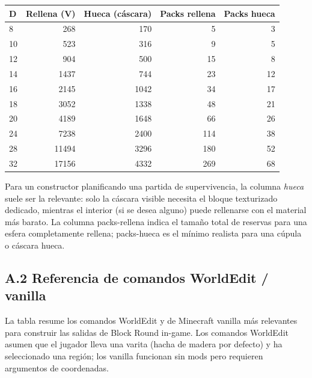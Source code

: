 \documentclass[12pt,a4paper]{scrartcl}
\begin{document}
\vspace{0.4em}
\begin{center}
\begin{tabular}{@{}lrrrr@{}}
\toprule
\textbf{D} & \textbf{Rellena (V)} & \textbf{Hueca (cáscara)} & \textbf{Packs rellena} & \textbf{Packs hueca} \\
\midrule
8   &   268 &   170 &  5  &  3  \\
10  &   523 &   316 &  9  &  5  \\
12  &   904 &   500 & 15  &  8  \\
14  &  1437 &   744 & 23  & 12  \\
16  &  2145 &  1042 & 34  & 17  \\
18  &  3052 &  1338 & 48  & 21  \\
20  &  4189 &  1648 & 66  & 26  \\
24  &  7238 &  2400 & 114 & 38  \\
28  & 11494 &  3296 & 180 & 52  \\
32  & 17156 &  4332 & 269 & 68  \\
\bottomrule
\end{tabular}
\end{center}

Para un constructor planificando una partida de supervivencia, la columna \emph{hueca} suele ser la relevante: solo la cáscara visible necesita el bloque texturizado dedicado, mientras el interior (si se desea alguno) puede rellenarse con el material más barato. La columna packs-rellena indica el tamaño total de reservas para una esfera completamente rellena; packs-hueca es el mínimo realista para una cúpula o cáscara hueca.

\subsection*{A.2 Referencia de comandos WorldEdit / vanilla}
La tabla resume los comandos WorldEdit y de Minecraft vanilla más relevantes para construir las salidas de Block Round in-game. Los comandos WorldEdit asumen que el jugador lleva una varita (hacha de madera por defecto) y ha seleccionado una región; los vanilla funcionan sin mods pero requieren argumentos de coordenadas.
\end{document}

